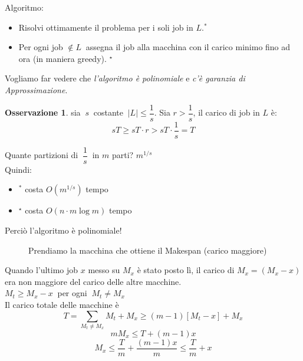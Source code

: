 \documentclass[a4paper]{article}
\theoremstyle{definition}
\newtheorem{obs}{Osservazione}[subsection]
\begin{document}
		\noindent
		Algoritmo:
		\begin{itemize}
			\item Risolvi ottimamente il problema per i soli job in $ L $.$ ^* $
			\item Per ogni job $ \notin L\ $ assegna il job alla macchina con il carico minimo fino ad ora (in maniera greedy). $ ^{\star} $
		\end{itemize}
		Vogliamo far vedere che \textit{l'algoritmo è polinomiale} e \textit{c'è garanzia di Approssimazione}.
		
		\begin{obs} 
			sia $\ s\ $ costante $\ |L| \leq \dfrac{1}{s} $. Sia $ r > \dfrac{1}{s} $, il carico di job in $ L $ è:
			\[
				sT \geq sT\cdot r > sT \cdot \dfrac{1}{s} = T
			\]
		\end{obs}
		Quante partizioni di $\ \dfrac{1}{s}\ $ in $ m $ parti? $ m^{1/s} $\\
		Quindi: 
		\begin{itemize}
			\item $ ^* $ costa $ O(m^{1/s}) $ tempo
			\item $ ^{\star} $ costa $ O(n\cdot m\log m) $ tempo
		\end{itemize}
		Perciò l'algoritmo è polinomiale!

		\newpage
		
		\begin{figure}[h!]
			\centering
			\caption{Prendiamo la macchina che ottiene il Makespan (carico maggiore)}
		\end{figure}
		Quando l'ultimo job $ x $ messo su $ M_x $ è stato posto lì, il carico di $ M_x = (M_x - x) $ era non maggiore del carico delle altre macchine.\\
		$ M_t \geq M_x - x \ $ per ogni $ \ M_t \neq M_x $\\
		Il carico totale delle macchine è 
		\[
			T = \sum\limits_{M_t \neq M_x} M_t + M_x \geq (m - 1)\left[ M_t - x\right] + M_x 
		\]
		\[
			m M_x \leq T + (m - 1) x
		\]
		\[
			M_x \leq \dfrac{T}{m} + \dfrac{(m - 1)x}{m} \leq \dfrac{T}{m} + x
		\]
		
\end{document}
